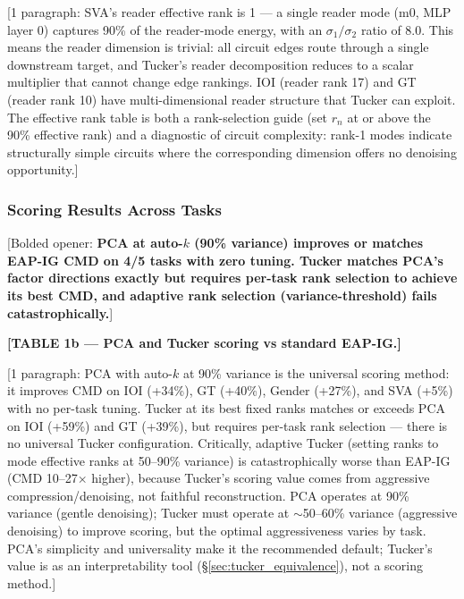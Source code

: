 \documentclass[11pt]{article}
\begin{document}
[1 paragraph: SVA's reader effective rank is 1 --- a single reader mode
(m0, MLP layer 0) captures 90\% of the reader-mode energy, with an
$\sigma_1/\sigma_2$ ratio of 8.0. This means the reader dimension is
trivial: all circuit edges route through a single downstream target,
and Tucker's reader decomposition reduces to a scalar multiplier that
cannot change edge rankings. IOI (reader rank 17) and GT (reader rank 10)
have multi-dimensional reader structure that Tucker can exploit. The
effective rank table is both a rank-selection guide (set $r_n$ at or
above the 90\% effective rank) and a diagnostic of circuit complexity:
rank-1 modes indicate structurally simple circuits where the corresponding
dimension offers no denoising opportunity.]

\subsubsection{Scoring Results Across Tasks}

[Bolded opener: \textbf{PCA at auto-$k$ (90\% variance) improves or
matches EAP-IG CMD on 4/5 tasks with zero tuning. Tucker matches PCA's
factor directions exactly but requires per-task rank selection to achieve
its best CMD, and adaptive rank selection (variance-threshold) fails
catastrophically.}]

\textbf{[TABLE 1b --- PCA and Tucker scoring vs standard EAP-IG.]}

[1 paragraph: PCA with auto-$k$ at 90\% variance is the universal
scoring method: it improves CMD on IOI (+34\%), GT (+40\%), Gender
(+27\%), and SVA (+5\%) with no per-task tuning. Tucker at its
best fixed ranks matches or exceeds PCA on IOI (+59\%) and GT (+39\%),
but requires per-task rank selection --- there is no universal Tucker
configuration. Critically, adaptive Tucker (setting ranks to mode
effective ranks at 50--90\% variance) is catastrophically worse than
EAP-IG (CMD 10--27$\times$ higher), because Tucker's scoring value
comes from aggressive compression/denoising, not faithful reconstruction.
PCA operates at 90\% variance (gentle denoising); Tucker must operate
at $\sim$50--60\% variance (aggressive denoising) to improve scoring,
but the optimal aggressiveness varies by task. PCA's simplicity and
universality make it the recommended default; Tucker's value is as an
interpretability tool (\S\ref{sec:tucker_equivalence}), not a scoring
method.]
\end{document}
